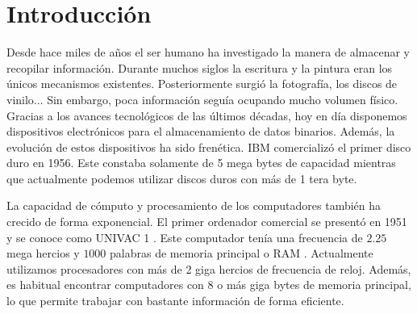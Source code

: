 \documentclass[10pt]{article}
\begin{document}
\makeatletter\renewcommand{\ALG@name}{Algoritmo}

\maketitle



\newpage
\tableofcontents
\newpage


\section{Introducción} \label{sec:introduction}

	Desde hace miles de años el ser humano ha investigado la manera de almacenar y recopilar información. Durante muchos siglos la escritura y la pintura eran los únicos mecanismos existentes. Posteriormente surgió la fotografía, los discos de vinilo... Sin embargo, poca información seguía ocupando mucho volumen físico. Gracias a los avances tecnológicos de las últimos décadas, hoy en día disponemos dispositivos electrónicos para el almacenamiento de datos binarios. Además, la evolución de estos dispositivos ha sido frenética. IBM comercializó el primer disco duro en 1956. Este constaba solamente de 5 mega bytes de capacidad \cite{hard-disks} mientras que actualmente podemos utilizar discos duros con más de 1 tera byte.

	La capacidad de cómputo y procesamiento de los computadores también ha crecido de forma exponencial. El primer ordenador comercial se presentó en 1951 y se conoce como  UNIVAC 1 \cite{first-commercial-computer}. Este computador tenía una frecuencia de $2.25$ mega hercios y $1000$ palabras de memoria principal o RAM \cite{caract}. Actualmente utilizamos procesadores con más de 2 giga hercios de frecuencia de reloj. Además, es habitual encontrar computadores con $8$ o más giga bytes de memoria principal, lo que permite trabajar con bastante información de forma eficiente. 
\end{document}
